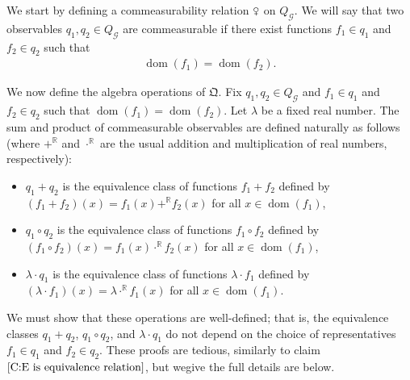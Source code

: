 \documentclass{scrartcl}
\DeclareMathOperator{\dom}{dom}
\newcommand{\SG}{\mathscr{G}}
\newcommand{\BR}{\mathbb{R}}
\newcommand{\com}{\mathrel{\venus}}
\begin{document}
We start by defining a commeasurability relation $\com$ on $Q_{\SG}$. We will say that two observables $q_1, q_2\in Q_{\SG}$ are commeasurable if there exist functions $f_1\in q_1$ and $f_2\in q_2$ such that
\begin{align*}
\dom(f_1) = \dom(f_2).
\end{align*}

We now define the algebra operations of $\mathfrak{Q}$. Fix $q_1, q_2\in Q_{\SG}$ and 
 $f_1\in q_1$ and $f_2\in q_2$ such that $\dom(f_1) = \dom(f_2)$. Let $\lambda$ be a fixed real number. The sum and product of commeasurable observables are defined naturally as follows (where $+^{\BR}$ and $\cdot^{\BR}$ are the usual addition and multiplication of real numbers, respectively):

\begin{itemize}

\item 
$q_1 + q_2$ is the equivalence class of functions $f_1 + f_2$ defined by $(f_1+f_2)(x)=f_1(x)+^{\BR}f_2(x)$ for all $x\in\dom(f_1)$,

\item 
$q_1 \circ q_2$ is the equivalence class of functions $f_1 \circ f_2$ defined by $(f_1\circ f_2)(x)=f_1(x)\cdot^{\BR} f_2(x)$ for all $x\in\dom(f_1)$,


\item
$\lambda\cdot q_1$ is the equivalence class of functions $\lambda\cdot f_1$ defined by $(\lambda\cdot f_1)(x)=\lambda\cdot^{\BR}f_1(x)$ for all $x\in\dom(f_1)$.
\end{itemize}

We must show that these operations are well-defined; that is, the equivalence classes $q_1+q_2$, $q_1\circ q_2$, and $\lambda\cdot q_1$ do not depend on the choice of representatives $f_1\in q_1$ and $f_2\in q_2$. These proofs are tedious, similarly to claim $\ref{C:E is equivalence relation}$, but wegive the full details are below.
\end{document}
